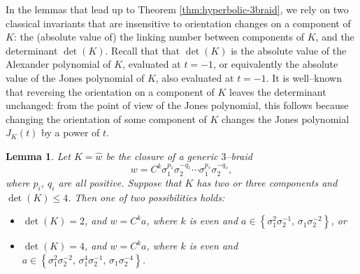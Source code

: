 \documentclass[11pt]{amsart}
\theoremstyle{plain}
\newtheorem{lemma}[theorem]{Lemma}
\theoremstyle{definition}
\begin{document}
In the lemmas that lead up to Theorem \ref{thm:hyperbolic-3braid}, we rely on two classical invariants that are insensitive to orientation changes on a component of $K$: the (absolute value of) the linking number between components of $K$, and the determinant $\det(K)$. Recall that that $\det(K)$ is the absolute value of the Alexander polynomial of $K$, evaluated at $t=-1$, or  equivalently the absolute value  of the Jones polynomial of $K$, also evaluated at $t=-1$.
It is well--known that reversing the orientation on a component of $K$ leaves the determinant unchanged: from the point of view of the Jones polynomial, this follows because changing the orientation
of some component of $K$ changes the Jones polynomial $J_K(t)$ by a power of $t$.

\begin{lemma}\label{lemma:determinant}
Let $K = \hat{w}$ be the closure of a generic $3$--braid 
$$w =  C^k
\sigma_1^{p_1} \sigma_2^{-q_1} \cdots \sigma_1^{p_s} \sigma_2^{-q_s},$$
where $p_i$, $q_i$ are all positive. Suppose that $K$ has two or three components and $\det(K) \leq 4$. Then one of two possibilities holds:
\begin{itemize}
\item[(a)] $\det(K) =2$, and $w = C^k a$, where $k$ is even and $a \in \left\{  \sigma_1^2 \sigma_2^{-1} , \,  \sigma_1
\sigma_2^{-2} \right\}$, or
\smallskip
\item[(b)] $\det(K) =4$, and $w = C^k a$, where $k$ is even and $a \in \left\{ \sigma_1^2 \sigma_2^{-2}, \,  \sigma_1^4
\sigma_2^{-1}, \,  \sigma_1 \sigma_2^{-4} \right\}$.
\end{itemize}
\end{lemma}
 
\end{document}

